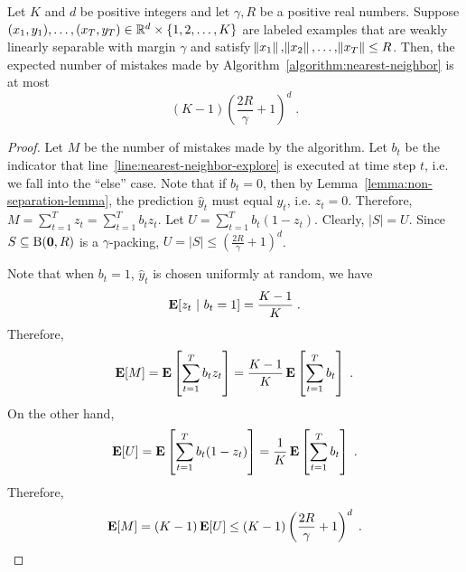 \begin{theorem}
\label{theorem:mistake-bound-for-nearest-neighbor-algorithm}
Let $K$ and $d$ be positive integers and let $\gamma,R$ be a positive real
numbers. Suppose $(x_1,y_1), \ldots, (x_T, y_T) \in
\mathbb{R}^d \times \{1,2,\dots,K\}$ are labeled examples that are weakly linearly
separable with margin $\gamma$ and satisfy $\norm{x_1}, \norm{x_2}, \dots,
\norm{x_T} \le R$. Then, the expected number of mistakes made by
Algorithm~\ref{algorithm:nearest-neighbor} is at most
$$
(K-1) \left( \frac{2R}{\gamma} + 1\right)^d \; .
$$
\end{theorem}

\begin{proof}
Let $M$ be the number of mistakes made by the algorithm. Let $b_t$ be the
indicator that line~\ref{line:nearest-neighbor-explore} is executed at time step
$t$, i.e. we fall into the ``else'' case. Note that if $b_t = 0$, then by
Lemma~\ref{lemma:non-separation-lemma}, the prediction $\widehat{y}_t$ must equal
$y_t$, i.e. $z_t = 0$. Therefore, $M = \sum_{t=1}^T z_t = \sum_{t=1}^T b_t z_t$.
Let $U = \sum_{t=1}^T b_t (1-z_t)$. Clearly, $|S| = U$. Since $S \subseteq \operatorname{B}(\mathbf{0}, R)$
is a $\gamma$-packing, $U = |S| \le (\frac{2R}{\gamma} + 1)^d$.

Note that when $b_t = 1$, $\widehat{y}_t$ is chosen uniformly at random, we have
$$
\operatorname*{\mathbf{E}}[ z_t ~|~ b_t = 1] = \frac{K-1}{K} \; .
$$
Therefore,
$$
\operatorname*{\mathbf{E}}[M] = \operatorname*{\mathbf{E}} \left[ \sum_{t=1}^T b_t z_t \right] = \frac{K-1}{K} \operatorname*{\mathbf{E}} \left[ \sum_{t=1}^T b_t \right] \; .
$$
On the other hand,
$$
\operatorname*{\mathbf{E}}[U] = \operatorname*{\mathbf{E}} \left[ \sum_{t=1}^T b_t (1-z_t) \right] = \frac 1 K \operatorname*{\mathbf{E}} \left[\sum_{t=1}^T b_t \right] \; .
$$
Therefore,
$$
\operatorname*{\mathbf{E}}[M] = (K-1) \operatorname*{\mathbf{E}}[U] \leq (K-1) \left(\frac{2R}{\gamma} + 1 \right)^d \; .
$$
\end{proof}
